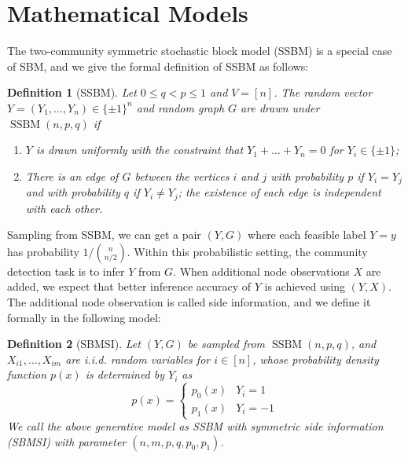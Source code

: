 \documentclass[conference,letterpaper]{IEEEtran}
\newtheorem{definition}{Definition}
\DeclareMathOperator{\SSBM}{SSBM}
\DeclareMathOperator{\Bern}{Bern}
\begin{document}
\section{Mathematical Models}\label{s:model}
The two-community symmetric stochastic block model (SSBM) is a special case of SBM, and we give the formal definition of SSBM as follows:
\begin{definition}[SSBM]
	Let $0\leq q<p\leq 1$ and $V=[n]$. The random vector $Y=(Y_1,\dots,Y_n)\in \{\pm 1\}^n$ and random graph $G$ are drawn under $\SSBM(n,p,q)$ if
	\begin{enumerate}
		\item $Y$ is drawn uniformly with the constraint that $Y_1 + \dots  + Y_n = 0$ for $Y_i \in \{\pm 1 \}$;
		
		\item There is an edge of $G$ between the vertices $i$ and $j$ with probability $p$ if $Y_i=Y_j$ and with probability $q$ if $Y_i \neq Y_j$; the existence of each edge is independent with each other.
	\end{enumerate}
\end{definition}
Sampling from SSBM, we can get a pair $(Y,G)$ where each feasible label $Y=y$ has probability $ 1/ \binom{n}{n/2}$.
Within this probabilistic setting, the community detection task is to infer $Y$ from $G$.
When
additional node observations $X$ are added, we expect that better inference accuracy of $Y$ is achieved using $(Y,X)$.
The additional node observation is called side information, and we define it formally in the following model:
\begin{definition}[SBMSI]
	Let $(Y,G)$ be sampled from
	$\SSBM(n,p,q)$, and $X_{i1}, \dots, X_{im}$ are i.i.d. random variables for $i \in [n]$,
	whose probability density function $p(x)$ is determined by $Y_i$ as
	\begin{equation}
	p(x) = \begin{cases}
	p_0(x) & Y_i = 1 \\
	p_1(x) & Y_i = -1
	\end{cases}
	\end{equation}
	We call the above generative model as SSBM with symmetric side information (SBMSI) with parameter $(n,m,p,q,p_0,p_1)$.
\end{definition}
\end{document}
